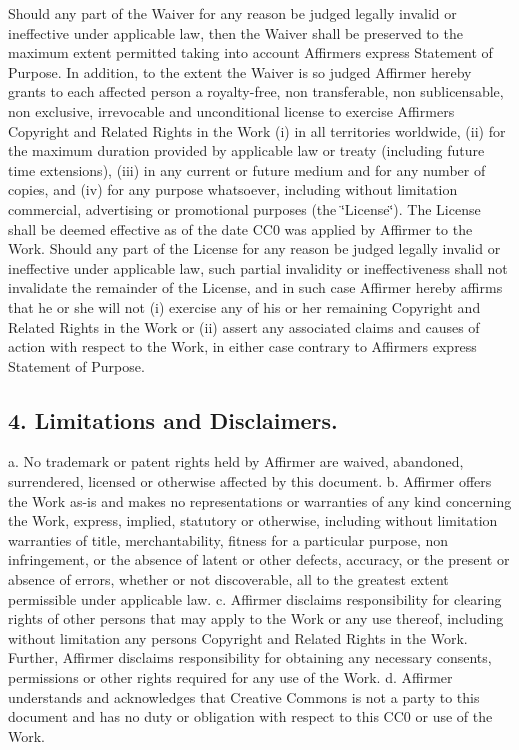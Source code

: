 Should any part of the Waiver for any reason be judged legally invalid or ineffective under applicable law, then the Waiver shall be preserved to the maximum extent permitted taking into account Affirmer\textquotesingle{}s express Statement of Purpose. In addition, to the extent the Waiver is so judged Affirmer hereby grants to each affected person a royalty-\/free, non transferable, non sublicensable, non exclusive, irrevocable and unconditional license to exercise Affirmer\textquotesingle{}s Copyright and Related Rights in the Work (i) in all territories worldwide, (ii) for the maximum duration provided by applicable law or treaty (including future time extensions), (iii) in any current or future medium and for any number of copies, and (iv) for any purpose whatsoever, including without limitation commercial, advertising or promotional purposes (the \char`\"{}\+License\char`\"{}). The License shall be deemed effective as of the date C\+C0 was applied by Affirmer to the Work. Should any part of the License for any reason be judged legally invalid or ineffective under applicable law, such partial invalidity or ineffectiveness shall not invalidate the remainder of the License, and in such case Affirmer hereby affirms that he or she will not (i) exercise any of his or her remaining Copyright and Related Rights in the Work or (ii) assert any associated claims and causes of action with respect to the Work, in either case contrary to Affirmer\textquotesingle{}s express Statement of Purpose.

\subsection*{4. Limitations and Disclaimers. }

a. No trademark or patent rights held by Affirmer are waived, abandoned, surrendered, licensed or otherwise affected by this document. b. Affirmer offers the Work as-\/is and makes no representations or warranties of any kind concerning the Work, express, implied, statutory or otherwise, including without limitation warranties of title, merchantability, fitness for a particular purpose, non infringement, or the absence of latent or other defects, accuracy, or the present or absence of errors, whether or not discoverable, all to the greatest extent permissible under applicable law. c. Affirmer disclaims responsibility for clearing rights of other persons that may apply to the Work or any use thereof, including without limitation any person\textquotesingle{}s Copyright and Related Rights in the Work. Further, Affirmer disclaims responsibility for obtaining any necessary consents, permissions or other rights required for any use of the Work. d. Affirmer understands and acknowledges that Creative Commons is not a party to this document and has no duty or obligation with respect to this C\+C0 or use of the Work. 